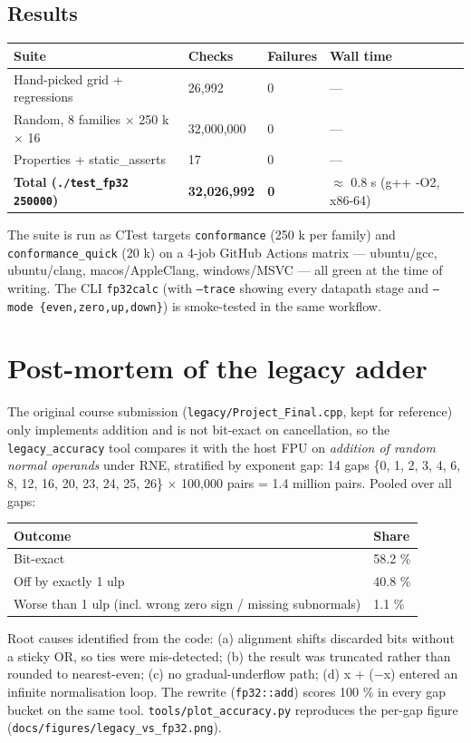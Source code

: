 \documentclass[11pt,a4paper]{article}
\begin{document}
\subsection{Results}
\begin{center}\small\begin{tabular}{llll}\toprule
Suite & Checks & Failures & Wall time\\\midrule
Hand-picked grid + regressions & 26,992 & 0 & —\\
Random, 8 families $\times$ 250 k $\times$ 16 & 32,000,000 & 0 & —\\
Properties + static\_asserts & 17 & 0 & —\\
\textbf{Total (\texttt{./test\_fp32 250000})} & \textbf{32,026,992} & \textbf{0} & $\approx$ 0.8 s (g++ -O2, x86-64)\\
\bottomrule\end{tabular}\end{center}
The suite is run as CTest targets \texttt{conformance} (250 k per family) and \texttt{conformance\_quick} (20 k) on a 4-job GitHub Actions matrix — ubuntu/gcc, ubuntu/clang, macos/AppleClang, windows/MSVC — all green at the time of writing. The CLI \texttt{fp32calc} (with \texttt{--trace} showing every datapath stage and \texttt{--mode \{even,zero,up,down\}}) is smoke-tested in the same workflow.

\section{Post-mortem of the legacy adder}
The original course submission (\texttt{legacy/Project\_Final.cpp}, kept for reference) only implements addition and is not bit-exact on cancellation, so the \texttt{legacy\_accuracy} tool compares it with the host FPU on \emph{addition of random normal operands} under RNE, stratified by exponent gap: 14 gaps \{0, 1, 2, 3, 4, 6, 8, 12, 16, 20, 23, 24, 25, 26\} $\times$ 100,000 pairs = 1.4 million pairs. Pooled over all gaps:

\begin{center}\small\begin{tabular}{ll}\toprule
Outcome & Share\\\midrule
Bit-exact & 58.2 \%\\
Off by exactly 1 ulp & 40.8 \%\\
Worse than 1 ulp (incl. wrong zero sign / missing subnormals) & 1.1 \%\\
\bottomrule\end{tabular}\end{center}
Root causes identified from the code: (a) alignment shifts discarded bits without a sticky OR, so ties were mis-detected; (b) the result was truncated rather than rounded to nearest-even; (c) no gradual-underflow path; (d) x + ($-$x) entered an infinite normalisation loop. The rewrite (\texttt{fp32::add}) scores 100 \% in every gap bucket on the same tool. \texttt{tools/plot\_accuracy.py} reproduces the per-gap figure (\texttt{docs/figures/legacy\_vs\_fp32.png}).
\end{document}
